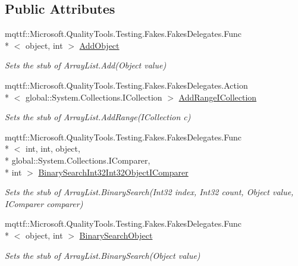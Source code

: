 \subsection*{Public Attributes}
\begin{DoxyCompactItemize}
\item 
mqttf\-::\-Microsoft.\-Quality\-Tools.\-Testing.\-Fakes.\-Fakes\-Delegates.\-Func\\*
$<$ object, int $>$ \hyperlink{class_system_1_1_collections_1_1_fakes_1_1_stub_array_list_a4c4c6a2f422e36af3e1e6292637687eb}{Add\-Object}
\begin{DoxyCompactList}\small\item\em Sets the stub of Array\-List.\-Add(\-Object value)\end{DoxyCompactList}\item 
mqttf\-::\-Microsoft.\-Quality\-Tools.\-Testing.\-Fakes.\-Fakes\-Delegates.\-Action\\*
$<$ global\-::\-System.\-Collections.\-I\-Collection $>$ \hyperlink{class_system_1_1_collections_1_1_fakes_1_1_stub_array_list_a00d2ee23c5c42eedde6f900e77ca0769}{Add\-Range\-I\-Collection}
\begin{DoxyCompactList}\small\item\em Sets the stub of Array\-List.\-Add\-Range(\-I\-Collection c)\end{DoxyCompactList}\item 
mqttf\-::\-Microsoft.\-Quality\-Tools.\-Testing.\-Fakes.\-Fakes\-Delegates.\-Func\\*
$<$ int, int, object, \\*
global\-::\-System.\-Collections.\-I\-Comparer, \\*
int $>$ \hyperlink{class_system_1_1_collections_1_1_fakes_1_1_stub_array_list_a78355e63c537b20d4dd31360bcbe39d3}{Binary\-Search\-Int32\-Int32\-Object\-I\-Comparer}
\begin{DoxyCompactList}\small\item\em Sets the stub of Array\-List.\-Binary\-Search(\-Int32 index, Int32 count, Object value, I\-Comparer comparer)\end{DoxyCompactList}\item 
mqttf\-::\-Microsoft.\-Quality\-Tools.\-Testing.\-Fakes.\-Fakes\-Delegates.\-Func\\*
$<$ object, int $>$ \hyperlink{class_system_1_1_collections_1_1_fakes_1_1_stub_array_list_a740609c3762970b663b77040c50b82a0}{Binary\-Search\-Object}
\begin{DoxyCompactList}\small\item\em Sets the stub of Array\-List.\-Binary\-Search(\-Object value)\end{DoxyCompactList}\item 

\end{DoxyCompactItemize}
